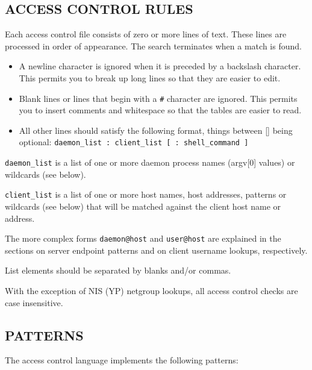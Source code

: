 \documentclass[11pt,twoside,a4paper]{book}
\begin{document}
\subsection*{ACCESS CONTROL RULES}

Each access control file consists of zero or more lines of text.
These lines are processed in order of appearance. The search
terminates when a match is found.

\begin{itemize}

\item A newline character is ignored when it is preceded by a
backslash character. This permits you to break up long lines so that
they are easier to edit.

\item Blank lines or lines that begin with a \texttt{\#} character are
ignored.  This permits you to insert comments and whitespace so that
the tables are easier to read.

\item All other lines should satisfy the following format, things
between [] being optional: \texttt{daemon\_list : client\_list [ :
shell\_command ] }

\end{itemize}

\texttt{daemon\_list} is a list of one or more daemon process names
(argv[0] values) or wildcards (see below).  

\texttt{client\_list} is a list of one or more host names, host
addresses, patterns or wildcards (see below) that will be matched
against the client host name or address.

The more complex forms \texttt{daemon@host} and \texttt{user@host} are
explained in the sections on server endpoint patterns and on client
username lookups, respectively.

List elements should be separated by blanks and/or commas.  

With the exception of NIS (YP) netgroup lookups, all access control
checks are case insensitive.

\subsection*{PATTERNS}

The access control language implements the following patterns:
\end{document}
